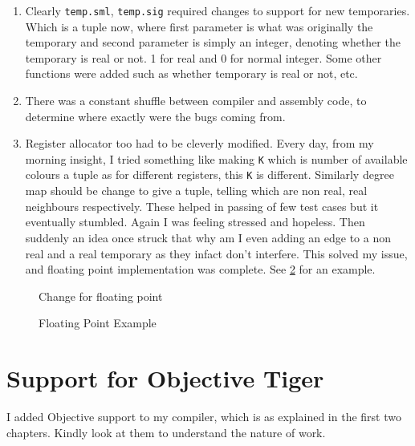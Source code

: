 \begin{enumerate}
	\item Clearly \texttt{temp.sml}, \texttt{temp.sig} required changes to support for new temporaries. Which is a tuple now, where first parameter is what was originally the temporary and second parameter is simply an integer, denoting whether the temporary is real or not. 1 for real and 0 for normal integer. Some other functions were added such as whether temporary is real or not, etc.
	\item There was a constant shuffle between compiler and assembly code, to determine where exactly were the bugs coming from.
	\item Register allocator too had to be cleverly modified. Every day, from my morning insight, I tried something like making \texttt{K} which is number of available colours a tuple as for different registers, this \texttt{K} is different. Similarly degree map should be change to give a tuple, telling which are non real, real neighbours respectively. These helped in passing of few test cases but it eventually stumbled. Again I was feeling stressed and hopeless. Then suddenly an idea once struck that why am I even adding an edge to a non real and a real temporary as they infact don't interfere. This solved my issue, and floating point implementation was complete. See \ref{fig:ft2} for an example.
\end{enumerate}

\begin{figure}
	\centering
	\caption{Change for floating point}
	\label{fig:ft1}
\end{figure}


\begin{figure}
	\centering
	\caption{Floating Point Example}
	\label{fig:ft2}
\end{figure}

\section{Support for Objective Tiger}

I added Objective support to my compiler, which is as explained in the first two chapters. Kindly look at them to understand the nature of work.
